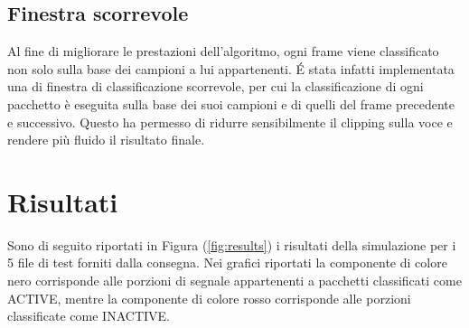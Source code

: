 \documentclass[10pt,twocolumn]{article}
\begin{document}
{\subsection{Finestra scorrevole}
Al fine di migliorare le prestazioni dell'algoritmo, ogni frame viene classificato non solo sulla base dei
campioni a lui appartenenti. É stata infatti implementata una di finestra di classificazione scorrevole,
per cui la classificazione di ogni pacchetto è eseguita sulla base dei suoi campioni e di quelli del frame
precedente e successivo. Questo ha permesso di ridurre sensibilmente il clipping sulla voce e rendere più
fluido il risultato finale. 

\section{Risultati}
{Sono di seguito riportati in Figura (\ref{fig:results}) i risultati della simulazione per i 5 file di test forniti dalla consegna. Nei grafici riportati la componente di colore nero corrisponde alle porzioni di segnale appartenenti a pacchetti classificati come ACTIVE, mentre la componente di colore rosso corrisponde alle porzioni classificate come INACTIVE.}

}
\end{document}
